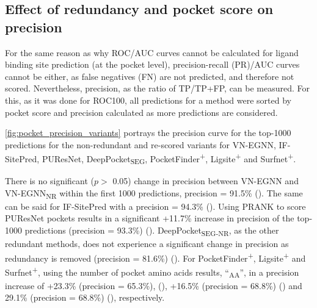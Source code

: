 \subsection{Effect of redundancy and pocket score on precision}

For the same reason as why ROC/AUC curves cannot be calculated for ligand binding site prediction (at the pocket level), precision-recall (PR)/AUC curves cannot be either, as false negatives (FN) are not predicted, and therefore not scored. Nevertheless, precision, as the ratio of TP/TP+FP, can be measured. For this, as it was done for ROC100, all predictions for a method were sorted by pocket score and precision calculated as more predictions are considered.

\autoref{fig:pocket_precision_variants} portrays the precision curve for the top-1000 predictions for the non-redundant and re-scored variants for VN-EGNN, IF-SitePred, PUResNet, DeepPocket\textsubscript{SEG}, PocketFinder\textsuperscript{+}, Ligsite\textsuperscript{+} and Surfnet\textsuperscript{+}.

There is no significant ($p >$ 0.05) change in precision between VN-EGNN and VN-EGNN\textsubscript{NR} within the first 1000 predictions, precision = 91.5\% (). The same can be said for IF-SitePred with a precision = 94.3\% (). Using PRANK to score PUResNet pockets results in a significant +11.7\% increase in precision of the top-1000 predictions (precision = 93.3\%) (). DeepPocket\textsubscript{SEG-NR}, as the other redundant methods, does not experience a significant change in precision as redundancy is removed (precision = 81.6\%) (). For PocketFinder\textsuperscript{+}, Ligsite\textsuperscript{+} and Surfnet\textsuperscript{+}, using the number of pocket amino acids results, ``\textsubscript{AA}'', in a precision increase of +23.3\% (precision = 65.3\%), (), +16.5\% (precision = 68.8\%) () and 29.1\% (precision = 68.8\%) (), respectively. 

